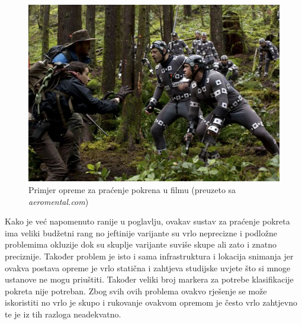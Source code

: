 \documentclass[times, utf8, diplomski]{fer}
\begin{document}
\begin{figure}[h!]
    \includegraphics[width=\textwidth]{planet.jpg}
    \caption{Primjer opreme za praćenje pokrena u filmu (preuzeto sa \textit{aeromental.com})}
    \label{planet}
\end{figure}

Kako je već napomenuto ranije u poglavlju, ovakav sustav za praćenje pokreta ima veliki budžetni rang no jeftinije varijante su
vrlo neprecizne i podložne problemima okluzije dok su skuplje varijante suviše skupe ali zato i znatno preciznije. Također problem
je isto i sama infrastruktura i lokacija snimanja jer ovakva postava opreme je vrlo statična i zahtjeva studijske uvjete što si mnoge
ustanove ne mogu priuštiti. Također veliki broj markera za potrebe klasifikacije pokreta nije potreban. Zbog svih ovih problema ovakvo 
rješenje se može iskoristiti no vrlo je skupo i rukovanje ovakvom opremom je često vrlo zahtjevno te je iz tih razloga neadekvatno.
\end{document}
